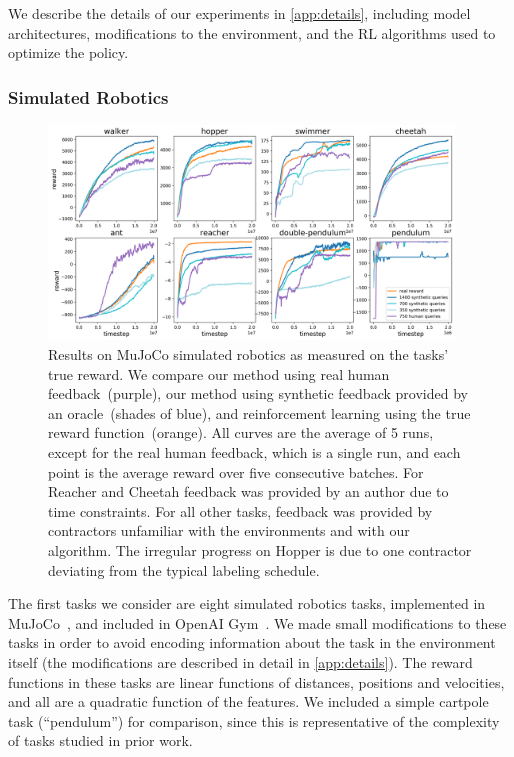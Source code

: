 \documentclass{article}
\def\plotsize{0.96}  %
\begin{document}
We describe the details of our experiments in \autoref{app:details},
including model architectures,
modifications to the environment,
and the RL algorithms used to optimize the policy.



\subsubsection{Simulated Robotics}

\begin{figure}[t]
\begin{center}
\includegraphics[width=\plotsize\textwidth]{main_mujoco_fig.png}
\end{center}
\caption{%
Results on MuJoCo simulated robotics as measured on the tasks' true reward.
We compare our method using real human feedback~(purple),
our method using synthetic feedback provided by an oracle~(shades of blue), and
reinforcement learning using the true reward function~(orange).
All curves are the average of 5 runs, except for
the real human feedback, which is a single run, and
each point is the average reward over five consecutive batches.
For Reacher and Cheetah
feedback was provided by an author due to time constraints.
For all other tasks,
feedback was provided by contractors
unfamiliar with the environments and with our algorithm.
The irregular progress on Hopper is due to one contractor deviating
from the typical labeling schedule.
}
\label{fig:mujoco-results}
\end{figure}

The first tasks we consider are
eight simulated robotics tasks, implemented in MuJoCo~\citep{Todorov12},
and included in OpenAI Gym~\citep{Brockman16}.
We made small modifications to these tasks
in order to avoid encoding information about the task
in the environment itself (the modifications are described in detail in \autoref{app:details}).
The reward functions in these tasks are linear functions of distances,
positions and velocities, and all are a quadratic function of the features.
We included a simple cartpole task (``pendulum'') for comparison,
since this is representative of the complexity of tasks studied in prior work.
\end{document}

